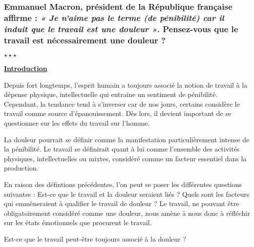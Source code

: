 \newpage \begin{center}
	\subsubsection*{Emmanuel Macron, président de la République française affirme : \textit{« Je n’aime pas le terme (de pénibilité) car il induit que le travail est une douleur »}. Pensez-vous que le travail est nécessairement une douleur ? }
	$\star \star \star$
\end{center}

%
%
\begin{center}
	\textbf{\underline{Introduction}} 
\end{center}

Depuis fort longtemps, l'esprit humain a toujours associé la notion de travail à la dépense physique, intellectuelle qui entraine un sentiment de pénibilité. Cependant, la tendance tend à s'inverser car de nos jours, certains considère le travail comme source d'épanouissement. Dès lors, il devient important de se questionner sur les effets du travail sur l'homme.

La douleur pourrait se définir comme la manifestation particulièrement intense de la pénibilité. Le travail se définirait quant à lui comme l'ensemble des activités physiques, intellectuelles ou mixtes, considéré comme un facteur essentiel dans la production.

En raison des défintions précédentes, l'on peut se poser les différentes questions suivantes : Est-ce que le travail et la douleur seraient liés ? Quels sont les facteurs qui emmèneraient à qualifier le travail de douleur ? Le travail, ne pouvant être obligatoirement considéré comme une douleur, nous amène à nous donc à réfléchir sur les états émotionnels que procurent le travail.

Est-ce que le travail peut-être toujours associé à la douleur ?

